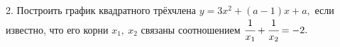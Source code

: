 2. Построить график квадратного трёхчлена $y=3x^2+(a-1)x+a,$ если известно,
что его корни $x_1,\ x_2$ связаны соотношением $\cfrac{1}{x_1}+\cfrac{1}{x_2}=-2.$\\

